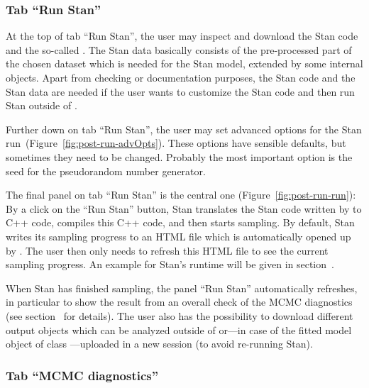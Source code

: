 \subsubsection[Tab "Run Stan"]{Tab ``Run Stan''}
\label{tab-run}

At the top of tab ``Run Stan'', the user may inspect and download
the Stan code and the so-called . The Stan data
basically consists of the
pre-processed part of the chosen dataset which is needed for the Stan
model, extended by some internal objects. Apart from checking or documentation
purposes, the Stan code and the Stan data are needed if
the user wants to customize the Stan code and then run Stan
outside of .

Further down on tab ``Run Stan'', the user may set advanced options
for the Stan run~(Figure~\ref{fig:post-run-advOpts}). These options have
sensible defaults, but sometimes they need to be changed. Probably the most
important option is the seed for the pseudorandom number generator.

The final panel on tab ``Run Stan'' is the central one
(Figure~\ref{fig:post-run-run}): By a click on the ``Run Stan''
button, Stan translates the Stan code written by  to
C++ code, compiles this C++ code, and then starts sampling. By
default, Stan writes its sampling progress to an HTML file which is
automatically opened up by . The user then only needs to
refresh this HTML file to see the current sampling progress. An example
for Stan's runtime will be given in section~.

When Stan has finished sampling, the panel ``Run Stan''
automatically refreshes, in particular to show the result from an overall
check of the MCMC diagnostics (see section~
for details). The user also has the possibility to download different output
objects which can be analyzed outside of  or---in case of the
fitted model object of class ---uploaded in a new
 session (to avoid re-running Stan).

\subsubsection[Tab "MCMC diagnostics"]{Tab ``MCMC diagnostics''}
\label{tab-MCMC}

